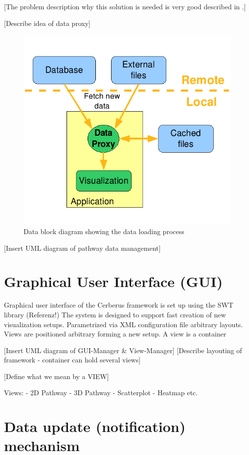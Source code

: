 [The problem description why this solution is needed is very good described in \cite{Bourqui2006}.]

[Describe idea of data proxy]

\begin{figure}[ht]
  \centering
    \includegraphics[width=0.5\linewidth]{gfx/data_block_diagram_new}
  \caption{Data block diagram showing the data loading process}
  \label{fig:data_block_diagram}
\end{figure}

[Insert UML diagram of pathway data management]



\section{Graphical User Interface (GUI)}

Graphical user interface of the Cerberus framework is set up using the SWT library (Referenz!) The system is designed to support fast creation of new visualization setups. Parametrized via XML configuration file arbitrary layouts. Views are positioned arbitrary forming a new setup. A view is a container 

[Insert UML diagram of GUI-Manager \& View-Manager]
[Describe layouting of framework - container can hold several views]

[Define what we mean by a VIEW]

Views:
- 2D Pathway
- 3D Pathway
- Scatterplot
- Heatmap etc.


\section{Data update (notification) mechanism}

